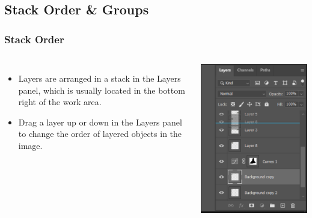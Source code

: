 \documentclass{beamer}
\begin{document}
			\subsection{Stack Order \& Groups}		
	\begin{frame}
		\frametitle{Stack Order}
	\begin{columns}
	\vspace{-25pt}
	\begin{itemize}
			\item Layers are arranged in a stack in the Layers panel, which is usually located in the bottom right of the work area.
\item Drag a layer up or down in the Layers panel to change the order of layered objects in the image.
	\end{itemize}
			\includegraphics[width = 1.0\textwidth]{images/stack order.png}
\end{columns}
\end{frame}
\end{document}
